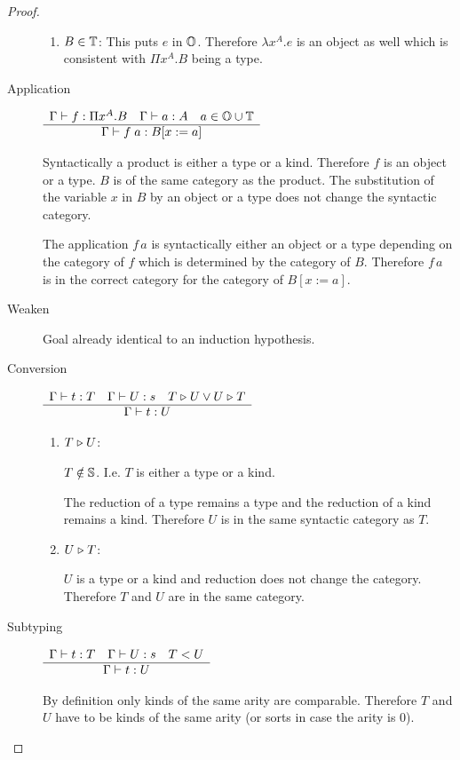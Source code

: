 \begin{theorem}
\begin{proof}
\begin{description}
\begin{enumerate}
        \item $B \in \mathbb{T}$: This puts $e$ in $\mathbb{O}$. Therefore $\lambda
          x^A.e$ is an object as well which is consistent with $\Pi x^A.B$
          being a type.
      \end{enumerate}

    \item[Application]
      $ \begin{array}{c} \Gamma \vdash f : \Pi x^A.B
        \quad
        \Gamma \vdash a : A
        \quad a \in \mathbb{O} \cup \mathbb{T} \\ \hline \Gamma \vdash f\; a : B[x:=a]\end{array}
      $

      Syntactically a product is either a type or a kind. Therefore $f$ is an
      object or a type. $B$ is of the same category as the product. The
      substitution of the variable $x$ in $B$ by an object or a type does not
      change the syntactic category.

      The application $f \, a$ is syntactically either an object or a type
      depending on the category of $f$ which is determined by the category of
      $B$. Therefore $f \, a$ is in the correct category for the category of
      $B[x:=a]$.

    \item[Weaken] Goal already identical to an induction hypothesis.

    \item[Conversion]
      $
      \begin{array}{c} 
        \Gamma \vdash t : T \quad
        \Gamma \vdash U : s \quad
        T \mathrel{\triangleright} U \lor U \mathrel{\triangleright} T
       \\ \hline 
        \Gamma \vdash t : U
      \end{array} $

      \begin{enumerate}

      \item $T\mathrel{\triangleright} U$:

        $T \notin \mathbb{S}$. I.e. $T$ is either a type or a kind.

        The reduction of a type remains a type and the reduction of a kind
        remains a kind. Therefore $U$ is in the same syntactic category as
        $T$.


      \item $U \mathrel{\triangleright} T$:

        $U$ is a type or a kind and reduction does not change the
        category. Therefore $T$ and $U$ are in the same category.
      \end{enumerate}

    \item[Subtyping]
      $ \begin{array}{c} 
        \Gamma \vdash t : T \quad
        \Gamma \vdash U : s \quad
        T < U
       \\ \hline 
        \Gamma \vdash t : U
      \end{array} $

      By definition only kinds of the same arity are comparable. Therefore $T$
      and $U$ have to be kinds of the same arity (or sorts in case the arity
      is 0).

    \end{description}

  \end{proof}
\end{theorem}


